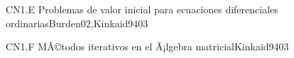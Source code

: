 \begin{syllabus}
\begin{unit}{CN1.E Problemas de valor inicial para ecuaciones diferenciales ordinarias}{Burden02,Kinkaid94}{0}{3}
   \begin{learningoutcomes}
      \item \CNONEObjONE
      \item \CNONEObjTWO
      \item \CNONEObjTHREE
      \item \CNONEObjFOUR
   \end{learningoutcomes}
\end{unit}

\begin{unit}{CN1.F MÃ©todos iterativos en el Ã¡lgebra matricial}{Kinkaid94}{0}{3}
\begin{topics}
      \item \CNONETopicLinear
      \item \CNONETopicFinite
   \end{topics}

   \begin{learningoutcomes}
      \item \CNONEObjONE
      \item \CNONEObjTWO
      \item \CNONEObjTHREE
      \item \CNONEObjFOUR
   \end{learningoutcomes}
\end{unit}



\begin{coursebibliography}
\end{coursebibliography}

\end{syllabus}

